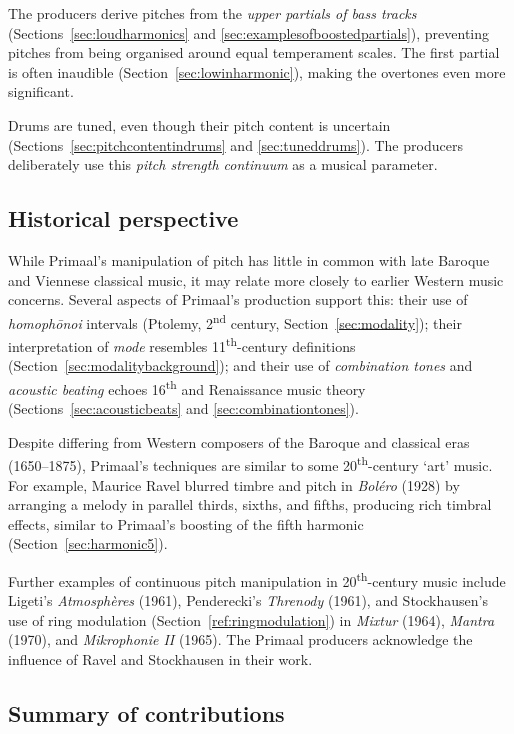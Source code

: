 \documentclass{article}
\begin{document}
The producers derive pitches from the \emph{upper partials of bass tracks} (Sections~\ref{sec:loudharmonics} and \ref{sec:examplesofboostedpartials}), preventing pitches from being organised around equal temperament scales. The first partial is often inaudible (Section~\ref{sec:lowinharmonic}), making the overtones even more significant.

Drums are tuned, even though their pitch content is uncertain (Sections~\ref{sec:pitchcontentindrums} and \ref{sec:tuneddrums}). The producers deliberately use this \emph{pitch strength continuum} as a musical parameter.


\subsection{Historical perspective}


While Primaal's manipulation of pitch has little in common with late Baroque and Viennese classical music, it may relate more closely to earlier Western music concerns. Several aspects of Primaal's production support this: their use of \emph{homoph\={o}noi} intervals (Ptolemy, 2\textsuperscript{nd} century, Section~\ref{sec:modality}); their interpretation of \emph{mode} resembles 11\textsuperscript{th}-century definitions (Section~\ref{sec:modalitybackground}); and their use of \emph{combination tones} and \emph{acoustic beating} echoes 16\textsuperscript{th} and Renaissance music theory (Sections~\ref{sec:acousticbeats} and  \ref{sec:combinationtones}).

Despite differing from Western composers of the Baroque and classical eras (1650--1875), Primaal's techniques are similar to some 20\textsuperscript{th}-century `art' music. For example, Maurice Ravel blurred timbre and pitch in {\em Bol\'ero\/} (1928) by arranging a melody in parallel thirds, sixths, and fifths, producing rich timbral effects, similar to Primaal's boosting of the fifth harmonic (Section~\ref{sec:harmonic5}).

Further examples of continuous pitch manipulation in 20\textsuperscript{th}-century music include Ligeti's {\em Atmosph\`eres\/} (1961), Penderecki's {\em Threnody\/} (1961), and Stockhausen's use of ring modulation (Section~\ref{ref:ringmodulation}) in {\em Mixtur\/} (1964), {\em Mantra\/} (1970), and {\em Mikrophonie II\/} (1965). The Primaal producers acknowledge the influence of Ravel and Stockhausen in their work.


\subsection{Summary of contributions}
\end{document}
